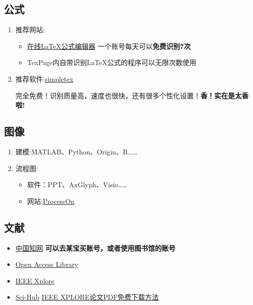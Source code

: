 \documentclass[withoutpreface,bwprint]{cumcmthesis} %
\begin{document}
\subsection{公式}
\begin{enumerate}
    \item 推荐网站:
    \begin{itemize}
        \item \href{https://www.latexlive.com/}{在线LaTeX公式编辑器}
        \quad 一个账号每天可以\textbf{免费识别7次}
        \item TexPage内自带识别LaTeX公式的程序可以无限次数使用
    \end{itemize}
    
    \item 推荐软件:\href{https://simpletex.cn/download}{simpletex}
    \par 完全免费！识别质量高，速度也很快，还有很多个性化设置！\textbf{香！实在是太香啦!}
\end{enumerate}

\subsection{图像}
\begin{enumerate}
    \item 建模:MATLAB、Python、Origin、R……
    \item 流程图:
    \begin{itemize}
        \item 软件：PPT、AxGlyph、Visio……
        \item 网站:\href{https://www.processon.com/}{ProcessOn}
    \end{itemize}
\end{enumerate}

\subsection{文献}
\begin{itemize}
    \item \href{https://www.cnki.net/}{中国知网}
    \quad \textbf{可以去某宝买账号，或者使用图书馆的账号}
    \item \href{https://www.oalib.com/}{Open Access Library}
    \item \href{https://ieeexplore.ieee.org/Xplore/home.jsp}{IEEE Xplore}
    \item \href{https://sci-hub.ru/}{Sci-Hub}
    \quad \href{https://zhuanlan.zhihu.com/p/369748238}{IEEE XPLORE论文PDF免费下载方法}
\end{itemize}
\end{document}
